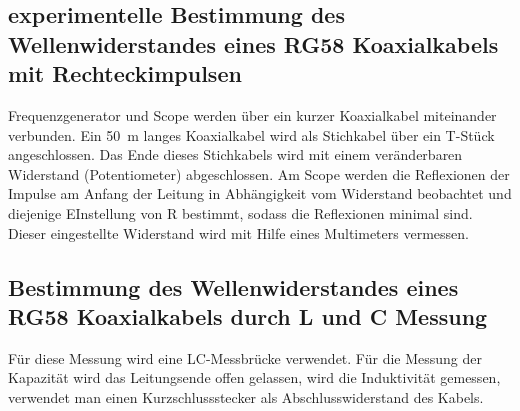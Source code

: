 \documentclass[a4paper,twoside,final]{article}
\begin{document}
\subsection{experimentelle Bestimmung des Wellenwiderstandes eines RG58 Koaxialkabels mit Rechteckimpulsen}\label{subsec:BestimmungZL}
Frequenzgenerator und Scope werden über ein kurzer Koaxialkabel miteinander verbunden. Ein \SI{50}{\meter} langes Koaxialkabel wird als Stichkabel über ein T-Stück angeschlossen. Das Ende dieses Stichkabels wird mit einem veränderbaren Widerstand (Potentiometer) abgeschlossen. Am Scope werden die Reflexionen der Impulse am Anfang der Leitung in Abhängigkeit vom Widerstand beobachtet und diejenige EInstellung von R bestimmt, sodass die Reflexionen minimal sind. Dieser eingestellte Widerstand wird mit Hilfe eines Multimeters vermessen.

\subsection{Bestimmung des Wellenwiderstandes eines RG58 Koaxialkabels durch L und C Messung}
Für diese Messung wird eine LC-Messbrücke verwendet. Für die Messung der Kapazität wird das Leitungsende offen gelassen, wird die Induktivität gemessen, verwendet man einen Kurzschlussstecker als Abschlusswiderstand des Kabels.
\end{document}
